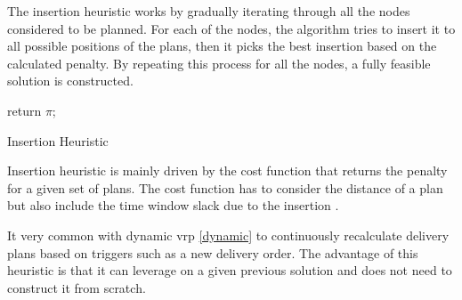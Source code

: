 The insertion heuristic works by gradually iterating through all the nodes considered to be planned. For each of the nodes, the algorithm tries to insert it to all possible positions of the plans, then it picks the best insertion based on the calculated penalty. By repeating this process for all the nodes, a fully feasible solution is constructed.\newline

\begin{algorithm}[H]
    \SetAlgoLined
    
    return $\pi$;
    \caption{Insertion Heuristic}
\end{algorithm}

\newline

Insertion heuristic is mainly driven by the cost function that returns the penalty for a given set of plans. The cost function has to consider the distance of a plan but also include the time window slack due to the insertion \cite{i1-tw}.

It very common with dynamic \gls{vrp} \ref{dynamic} to continuously recalculate delivery plans based on triggers such as a new delivery order. The advantage of this heuristic is that it can leverage on a given previous solution and does not need to construct it from scratch. 

